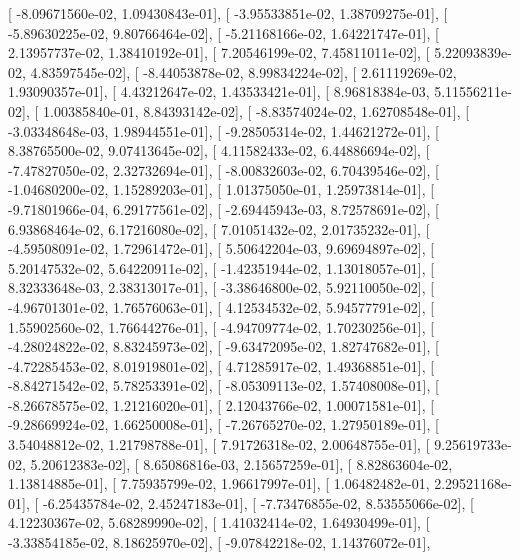 \documentclass{article}
\begin{document}
       [ -8.09671560e-02,   1.09430843e-01],
       [ -3.95533851e-02,   1.38709275e-01],
       [ -5.89630225e-02,   9.80766464e-02],
       [ -5.21168166e-02,   1.64221747e-01],
       [  2.13957737e-02,   1.38410192e-01],
       [  7.20546199e-02,   7.45811011e-02],
       [  5.22093839e-02,   4.83597545e-02],
       [ -8.44053878e-02,   8.99834224e-02],
       [  2.61119269e-02,   1.93090357e-01],
       [  4.43212647e-02,   1.43533421e-01],
       [  8.96818384e-03,   5.11556211e-02],
       [  1.00385840e-01,   8.84393142e-02],
       [ -8.83574024e-02,   1.62708548e-01],
       [ -3.03348648e-03,   1.98944551e-01],
       [ -9.28505314e-02,   1.44621272e-01],
       [  8.38765500e-02,   9.07413645e-02],
       [  4.11582433e-02,   6.44886694e-02],
       [ -7.47827050e-02,   2.32732694e-01],
       [ -8.00832603e-02,   6.70439546e-02],
       [ -1.04680200e-02,   1.15289203e-01],
       [  1.01375050e-01,   1.25973814e-01],
       [ -9.71801966e-04,   6.29177561e-02],
       [ -2.69445943e-03,   8.72578691e-02],
       [  6.93868464e-02,   6.17216080e-02],
       [  7.01051432e-02,   2.01735232e-01],
       [ -4.59508091e-02,   1.72961472e-01],
       [  5.50642204e-03,   9.69694897e-02],
       [  5.20147532e-02,   5.64220911e-02],
       [ -1.42351944e-02,   1.13018057e-01],
       [  8.32333648e-03,   2.38313017e-01],
       [ -3.38646800e-02,   5.92110050e-02],
       [ -4.96701301e-02,   1.76576063e-01],
       [  4.12534532e-02,   5.94577791e-02],
       [  1.55902560e-02,   1.76644276e-01],
       [ -4.94709774e-02,   1.70230256e-01],
       [ -4.28024822e-02,   8.83245973e-02],
       [ -9.63472095e-02,   1.82747682e-01],
       [ -4.72285453e-02,   8.01919801e-02],
       [  4.71285917e-02,   1.49368851e-01],
       [ -8.84271542e-02,   5.78253391e-02],
       [ -8.05309113e-02,   1.57408008e-01],
       [ -8.26678575e-02,   1.21216020e-01],
       [  2.12043766e-02,   1.00071581e-01],
       [ -9.28669924e-02,   1.66250008e-01],
       [ -7.26765270e-02,   1.27950189e-01],
       [  3.54048812e-02,   1.21798788e-01],
       [  7.91726318e-02,   2.00648755e-01],
       [  9.25619733e-02,   5.20612383e-02],
       [  8.65086816e-03,   2.15657259e-01],
       [  8.82863604e-02,   1.13814885e-01],
       [  7.75935799e-02,   1.96617997e-01],
       [  1.06482482e-01,   2.29521168e-01],
       [ -6.25435784e-02,   2.45247183e-01],
       [ -7.73476855e-02,   8.53555066e-02],
       [  4.12230367e-02,   5.68289990e-02],
       [  1.41032414e-02,   1.64930499e-01],
       [ -3.33854185e-02,   8.18625970e-02],
       [ -9.07842218e-02,   1.14376072e-01],
\end{document}
